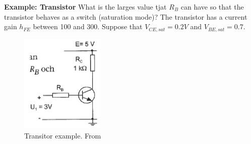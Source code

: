 %
%
%

\textbf{Example: Transistor}
What is the larges value tjat $R_B$ can have so that the transistor 
behaves as a switch (saturation mode)? The transistor has a current gain
$h_{FE}$ between 100 and 300. Suppose that $V_{CE,sat}=0.2V$ and
$V_{BE,sat}=0.7$.
\begin{figure}[h]
    \centering
    \includegraphics[width=4cm]{image/example-transistor.png}
    \caption{Transitor example. From \cite{}}
\end{figure}

